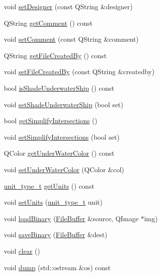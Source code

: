 \begin{DoxyCompactItemize}
\item 
void \hyperlink{classShipCAD_1_1ProjectSettings_abde123a71eba642ff1dbd62d547aa684}{set\-Designer} (const Q\-String \&designer)
\item 
Q\-String \hyperlink{classShipCAD_1_1ProjectSettings_a7687e8e358e8deb57e363ad8e5cfef17}{get\-Comment} () const 
\item 
void \hyperlink{classShipCAD_1_1ProjectSettings_a64e942847dd0838f04dc4ec32e9bc30e}{set\-Comment} (const Q\-String \&comment)
\item 
Q\-String \hyperlink{classShipCAD_1_1ProjectSettings_a8db64934b729181fbf65b767f6260bff}{get\-File\-Created\-By} () const 
\item 
void \hyperlink{classShipCAD_1_1ProjectSettings_a326e18ff53ba0f916d4d8cfab5a2d17f}{set\-File\-Created\-By} (const Q\-String \&createdby)
\item 
bool \hyperlink{classShipCAD_1_1ProjectSettings_a7b7fca3caf6e2dff52b96c818a87d13c}{is\-Shade\-Underwater\-Ship} () const 
\item 
void \hyperlink{classShipCAD_1_1ProjectSettings_a0f40362f42e6dfd4147d69573c00988f}{set\-Shade\-Underwater\-Ship} (bool set)
\item 
bool \hyperlink{classShipCAD_1_1ProjectSettings_a2e5f2bfb546885af0af8d857198b8cc9}{get\-Simplify\-Intersections} ()
\item 
void \hyperlink{classShipCAD_1_1ProjectSettings_a138264f53da99f6a1765ea7aec95096a}{set\-Simplify\-Intersections} (bool set)
\item 
Q\-Color \hyperlink{classShipCAD_1_1ProjectSettings_a043fdade48155fdb2b2fd2d9f6ec872c}{get\-Under\-Water\-Color} () const 
\item 
void \hyperlink{classShipCAD_1_1ProjectSettings_a06b1260b284a988fb62b49f7ab4d5bf3}{set\-Under\-Water\-Color} (Q\-Color \&col)
\item 
\hyperlink{namespaceShipCAD_ac6a7a28b4b063771afae92decb602da5}{unit\-\_\-type\-\_\-t} \hyperlink{classShipCAD_1_1ProjectSettings_af9e707de58afaa87f639c2426dbb1161}{get\-Units} () const 
\item 
void \hyperlink{classShipCAD_1_1ProjectSettings_a2310573735d3c0ad17ca290bca083f99}{set\-Units} (\hyperlink{namespaceShipCAD_ac6a7a28b4b063771afae92decb602da5}{unit\-\_\-type\-\_\-t} unit)
\item 
void \hyperlink{classShipCAD_1_1ProjectSettings_af6012d62299292d0757955b14c6bd854}{load\-Binary} (\hyperlink{classShipCAD_1_1FileBuffer}{File\-Buffer} \&source, Q\-Image $\ast$img)
\item 
void \hyperlink{classShipCAD_1_1ProjectSettings_aebda4677da789819020d1ea1623ec035}{save\-Binary} (\hyperlink{classShipCAD_1_1FileBuffer}{File\-Buffer} \&dest)
\item 
void \hyperlink{classShipCAD_1_1ProjectSettings_a9e0ce44e6aea8e57608baee2a3b05827}{clear} ()
\item 
void \hyperlink{classShipCAD_1_1ProjectSettings_a9caa9e15bc03de5b6092c419a58a87e8}{dump} (std\-::ostream \&os) const 
\end{DoxyCompactItemize}


